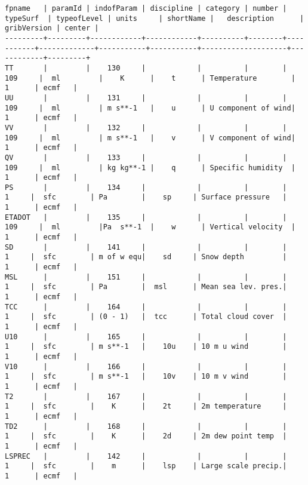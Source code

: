 \documentclass{egu}                  %
\begin{document}
\begin{landscape} 
\begin{scriptsize}\begin{verbatim}
fpname   | paramId | indofParam | discipline | category | number | typeSurf  | typeofLevel | units     | shortName |   description      | gribVersion | center |
---------+---------+------------+------------+----------+--------+-----------+-------------+-----------+-----------+--------------------+------------+---------+
TT       |         |    130     |            |          |        |   109     |  ml         |    K      |    t      | Temperature        |     1      | ecmf   |
UU       |         |    131     |            |          |        |   109     |  ml         | m s**-1   |    u      | U component of wind|     1      | ecmf   |
VV       |         |    132     |            |          |        |   109     |  ml         | m s**-1   |    v      | V component of wind|     1      | ecmf   |
QV       |         |    133     |            |          |        |   109     |  ml         | kg kg**-1 |    q      | Specific humidity  |     1      | ecmf   |
PS       |         |    134     |            |          |        |     1     |  sfc        | Pa        |    sp     | Surface pressure   |     1      | ecmf   |
ETADOT   |         |    135     |            |          |        |   109     |  ml         |Pa  s**-1  |    w      | Vertical velocity  |     1      | ecmf   |
SD       |         |    141     |            |          |        |     1     |  sfc        | m of w equ|    sd     | Snow depth         |     1      | ecmf   |
MSL      |         |    151     |            |          |        |     1     |  sfc        | Pa        |  msl      | Mean sea lev. pres.|     1      | ecmf   |
TCC      |         |    164     |            |          |        |     1     |  sfc        | (0 - 1)   |  tcc      | Total cloud cover  |     1      | ecmf   |
U10      |         |    165     |            |          |        |     1     |  sfc        | m s**-1   |    10u    | 10 m u wind        |     1      | ecmf   |
V10      |         |    166     |            |          |        |     1     |  sfc        | m s**-1   |    10v    | 10 m v wind        |     1      | ecmf   |
T2       |         |    167     |            |          |        |     1     |  sfc        |    K      |    2t     | 2m temperature     |     1      | ecmf   |  
TD2      |         |    168     |            |          |        |     1     |  sfc        |    K      |    2d     | 2m dew point temp  |     1      | ecmf   |
LSPREC   |         |    142     |            |          |        |     1     |  sfc        |    m      |    lsp    | Large scale precip.|     1      | ecmf   |

\end{verbatim}
\end{scriptsize}
\end{landscape}
\end{document}
